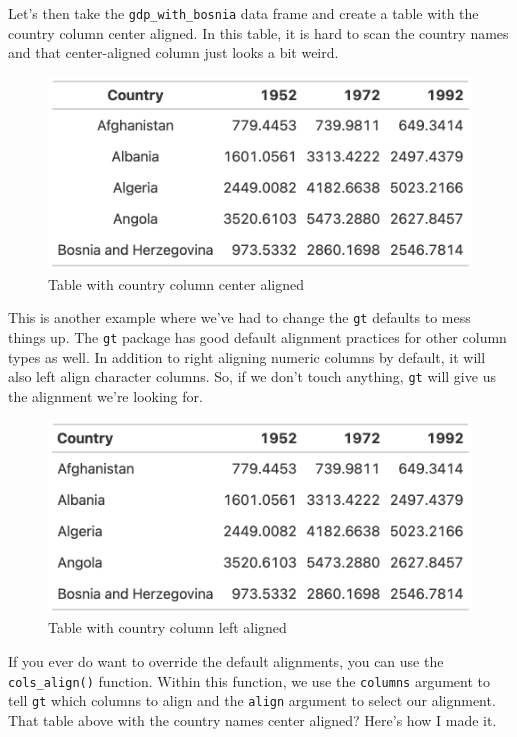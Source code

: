\documentclass[
]{book}
\begin{document}
Let's then take the \texttt{gdp\_with\_bosnia} data frame and create a table with the country column center aligned. In this table, it is hard to scan the country names and that center-aligned column just looks a bit weird.

\begin{figure}
\includegraphics[width=1\linewidth]{nostarch/temp/F05007} \caption{Table with country column center aligned}\label{fig:unnamed-chunk-25}
\end{figure}

This is another example where we've had to change the \texttt{gt} defaults to mess things up. The \texttt{gt} package has good default alignment practices for other column types as well. In addition to right aligning numeric columns by default, it will also left align character columns. So, if we don't touch anything, \texttt{gt} will give us the alignment we're looking for.

\begin{figure}
\includegraphics[width=1\linewidth]{nostarch/temp/F05008} \caption{Table with country column left aligned}\label{fig:unnamed-chunk-27}
\end{figure}

If you ever do want to override the default alignments, you can use the \texttt{cols\_align()} function. Within this function, we use the \texttt{columns} argument to tell \texttt{gt} which columns to align and the \texttt{align} argument to select our alignment. That table above with the country names center aligned? Here's how I made it.
\end{document}
